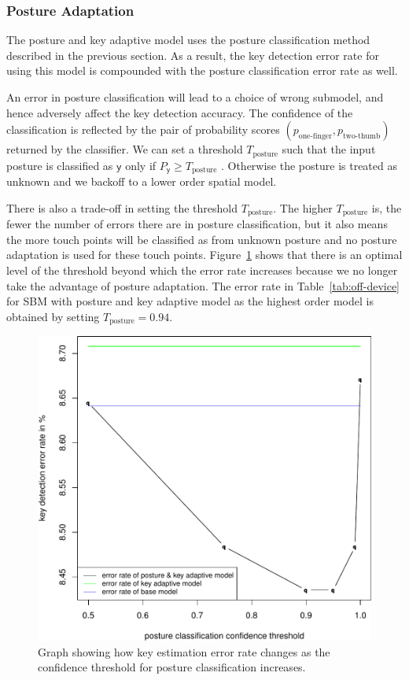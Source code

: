 \documentclass{sigchi}
\begin{document}
\subsubsection{Posture Adaptation}\label{sec:off-device-posture}
The posture and key adaptive model uses the posture classification
method described in the previous section. As a result, the
key detection error rate for using this model is compounded with the posture
classification error rate as well. 

An error in posture classification will lead to a choice of wrong submodel,
and hence adversely affect the key detection accuracy. The confidence of the classification is reflected by the pair of probability 
scores $(p_{\text{one-finger}}, p_{\text{two-thumb}})$ returned by the classifier. 
We can set a threshold $T_{\text{posture}}$ such that the input posture is classified
as $\textsf{y}$ only if $P_\textsf{y} \ge T_{\text{posture}}$ . Otherwise the posture is treated as
unknown and we backoff to a lower order spatial model.

There is also a trade-off in setting the threshold $T_{\text{posture}}$. The higher
 $T_{\text{posture}}$ is, the fewer the number of errors there are in posture classification, but it also means the more touch points will be classified as from unknown posture and no posture adaptation is used for these touch points. Figure~\ref{fig:posture-confidence} 
 shows that there is an optimal level of the threshold beyond which the error rate
 increases because we no longer take the advantage of posture adaptation. The error rate in Table~\ref{tab:off-device} for SBM with posture and key adaptive model as the highest order model is obtained by setting $T_{\text{posture}} = 0.94$.

\begin{figure}[tb]
 \includegraphics[width=0.9\columnwidth]{figures/error-confidence-cropped.pdf}
  \caption{Graph showing how key estimation error rate changes as the confidence
  threshold for posture classification increases.}
  \label{fig:posture-confidence}
\end{figure}
\end{document}
